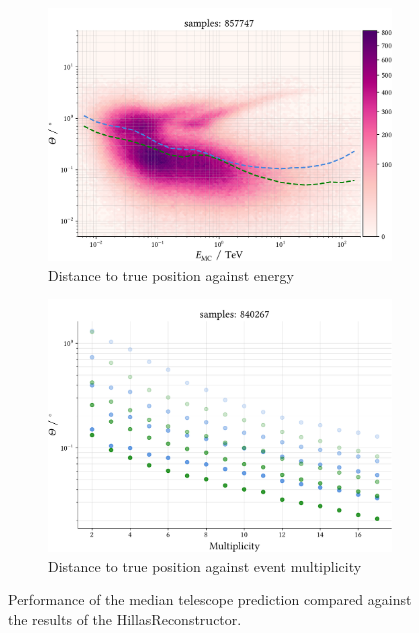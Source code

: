 \begin{figure}
    \centering
    \begin{subfigure}{0.75\textwidth}
        \includegraphics[width=\linewidth]{../analysis/plots/gamma/median_vs_energy.pdf} 
        \caption{Distance to true position against energy}
    \end{subfigure}
    \begin{subfigure}{0.75\textwidth}
        \includegraphics[width=\linewidth]{../analysis/plots/gamma/median_vs_multi_comp.pdf}
        \caption{Distance to true position against event multiplicity}
    \end{subfigure}
    \caption{Performance of the median telescope prediction compared 
    against the results of the HillasReconstructor. 
}
\end{figure}
